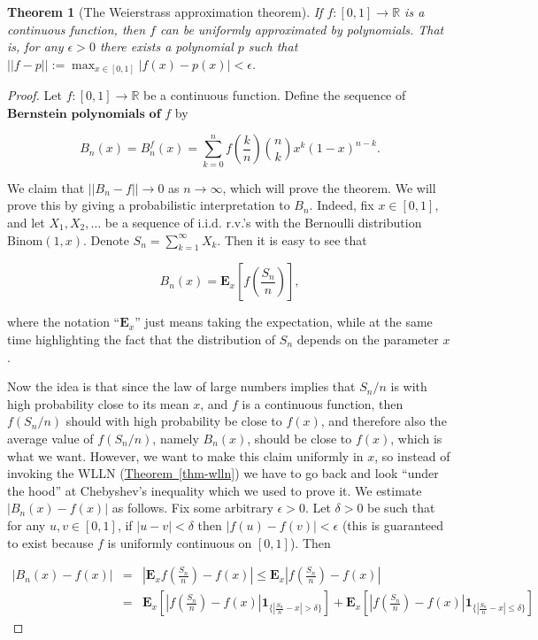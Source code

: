 \documentclass[11pt]{report}
\newcommand{\R}{\mathbb{R}}
\theoremstyle{plain}
\newtheorem{thm}{Theorem}[chapter]
\theoremstyle{definition}
\begin{document}
\begin{thm}[The Weierstrass approximation theorem]
If $f:[0,1]\to\R$ is a continuous function, then $f$
can be uniformly approximated by polynomials. That is,
for any $\epsilon>0$ there exists a polynomial $p$
such that
$||f-p||:=\max_{x\in[0,1]}|f(x)-p(x)|<\epsilon$.
\end{thm}

\begin{proof}
Let $f:[0,1]\to\R$ be a continuous function. Define
the sequence of $\textbf{Bernstein polynomials of } f$
by

\[
B_n(x)= B_n^f(x) = \sum_{k=0}^n f\left(\frac{k}{n}\right) \binom{n}{k} x^k (1-x)^{n-k}.
\]

\noindent We claim that $||B_n-f||\to 0$ as $n\to\infty$, which
will prove the theorem. We will prove this by giving a
probabilistic interpretation to $B_n$. Indeed, fix
$x\in [0,1]$, and let $X_1,X_2,\ldots$ be a sequence
of i.i.d. r.v.'s with the Bernoulli distribution
$\textrm{Binom}(1,x)$. Denote
$S_n=\sum_{k=1}^\infty X_k$. Then it is easy to see
that

\[
B_n(x) = \mathbf{E}_x \left[f\left(\frac{S_n}{n}\right)\right],
\]

\noindent where the notation ``$\mathbf{E}_x$'' just means
taking the expectation, while at the same time
highlighting the fact that the distribution of $S_n$
depends on the parameter $x$.

Now the idea is that since the law of large numbers
implies that $S_n/n$ is with high probability close
to its mean $x$, and $f$ is a continuous function,
then $f(S_n/n)$ should with high probability be close
to $f(x)$, and therefore also the average value of
$f(S_n/n)$, namely $B_n(x)$, should be close to
$f(x)$, which is what we want. However, we want to
make this claim uniformly in $x$, so instead of
invoking the WLLN (\hyperref[thm-wlln]{Theorem~\ref*{thm-wlln}}) we have to go
back and look ``under the hood'' at Chebyshev's
inequality which we used to prove it. We estimate
$|B_n(x)-f(x)|$ as follows. Fix some arbitrary
$\epsilon>0$. Let $\delta>0$ be such that for any
$u,v\in[0,1]$, if $|u-v|<\delta$ then
$|f(u)-f(v)|<\epsilon$ (this is guaranteed to exist
because $f$ is uniformly continuous on $[0,1]$). Then

\begin{eqnarray*}
|B_n(x)-f(x)| &=& \left|\mathbf{E}_x f\left(\frac{S_n}{n}\right)-f(x)\right| \le \mathbf{E}_x \left|f\left(\frac{S_n}{n}\right)-f(x)\right| \\
&=& \mathbf{E}_x \left[\left|f\left(\frac{S_n}{n}\right)-f(x)\right|\mathbf{1}_{\{ \left|\frac{S_n}{n}-x\right|>\delta \}}\right] +
\mathbf{E}_x \left[\left|f\left(\frac{S_n}{n}\right)-f(x)\right|\mathbf{1}_{\{ \left|\frac{S_n}{n}-x\right|\le\delta \}}\right]
\end{eqnarray*}


\end{proof}
\end{document}
